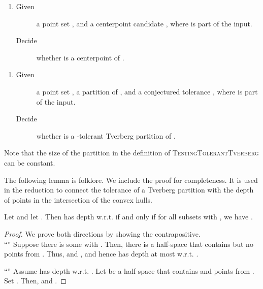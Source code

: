 \documentclass[oribibl,envcountsame,envcountsect]{llncs}
\begin{document}
\begin{problem}
  \begin{enumerate}
    \item[]
      \begin{description}
    \item[Given] a point set , and a centerpoint candidate
      , where  is part of the input.
    \item[Decide] whether  is a centerpoint of .
  \end{description}
  \end{enumerate}
\end{problem}

\begin{problem}
  \begin{enumerate}
    \item[]
      \begin{description}
    \item[Given] a point set , a
      partition  of , and a conjectured tolerance , where
       is part of the input.
    \item[Decide] whether  is a -tolerant Tverberg partition of .
  \end{description}
  \end{enumerate}
\end{problem}

Note that the size of the partition  in the definition of
\textsc{TestingTolerantTverberg} can be constant.

The following lemma is folklore. We include the proof for completeness.
It is used in the reduction to connect the tolerance of a
Tverberg partition with the depth of points in the intersection of the convex
hulls.

\begin{lemma}\label{com:lem:depth}
  Let  and let . Then  has depth  w.r.t.
   if and only if for all subsets  with , we have .
\end{lemma}
\begin{proof}
  We prove both directions by showing the contrapositive.\\
  \indent``''
        Suppose there is some  with . Then, there is a
        half-space  that contains  but no points from .
        Thus,
         and ,
        and hence  has depth at most  w.r.t. .

    ``''
        Assume  has depth  w.r.t. . Let  be a half-space that
        contains  and  points from . Set . Then,
         and .
\end{proof}
\end{document}
